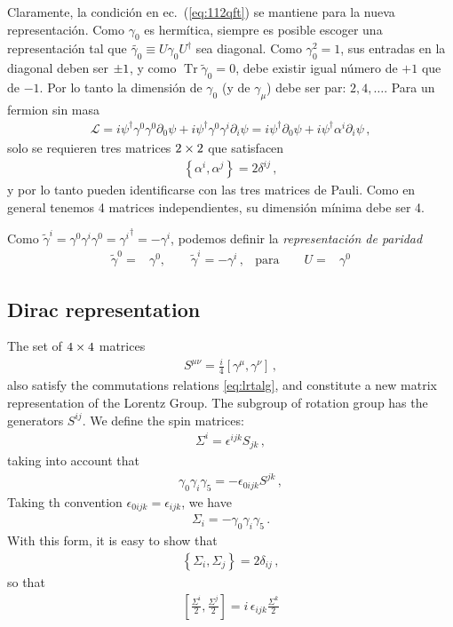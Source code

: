 Claramente, la condición en ec.~(\ref{eq:112qft}) se mantiene para la nueva representación. Como $\gamma_0$ es hermítica, siempre es posible escoger una representación tal que $\tilde{\gamma_0}\equiv U\gamma_0U^\dagger$ sea diagonal. Como $\gamma_0^2=1$, sus entradas en la diagonal deben ser $\pm1$, y como $\operatorname{Tr}\tilde\gamma_0=0$, debe existir igual número de $+1$ que de $-1$. Por lo tanto la dimensión de $\gamma_0$ (y de $\gamma_\mu$) debe ser par: $2,4,\ldots$. Para un fermion sin masa
\begin{align}
  \mathcal{L}=i\psi^\dagger\gamma^0\gamma^0\partial_0\psi+i\psi^\dagger\gamma^0\gamma^i\partial_i\psi=i\psi^\dagger\partial_0\psi+i\psi^\dagger\alpha^i\partial_i\psi\,,
\end{align}
solo se requieren tres matrices $2\times 2$ que satisfacen
\begin{align}
  \left\{\alpha^i,\alpha^j\right\} =2\delta^{ij}\,,
\end{align}
y por lo tanto pueden identificarse con las tres matrices de Pauli. 
Como en general tenemos 4 matrices independientes, su dimensión mínima debe ser 4.

Como $\tilde\gamma^i=\gamma^0\gamma^i\gamma^0={\gamma^i}^\dagger=-\gamma^i$, podemos definir la \emph{representación de paridad}
\begin{align}
\label{eq:parityrep}
\tilde\gamma^0=&\gamma^0,\qquad\tilde\gamma^i=-\gamma^i\,,&\text{para}\qquad U=&\gamma^0   
\end{align}




\begin{inprogress}
  \subsection{Dirac representation}
The set of $4\times 4$ matrices
\begin{align}
  S^{\mu\nu}=\frac{i}{4}\left[\gamma^\mu,\gamma^\nu\right]\,,
\end{align}
also satisfy the commutations relations \eqref{eq:lrtalg}, and constitute a new matrix representation of the Lorentz Group. The subgroup of rotation group has the generators $S^{ij}$. We define the spin matrices:
\begin{align}
  \Sigma^i=\epsilon^{ijk}S_{jk}\,,
\end{align}
taking into account that
\begin{align}
  \gamma_0\gamma_i\gamma_5=-\epsilon_{0ijk}S^{jk}\,,
\end{align}
Taking th convention $\epsilon_{0ijk}=\epsilon_{ijk}$, we have
\begin{align}
  \Sigma_{i}=-\gamma_0\gamma_i\gamma_5\,.
\end{align}
With this form, it is easy to show that
\begin{align}
  \left\{\Sigma_i,\Sigma_j\right\}=2\delta_{ij}\,, 
\end{align}
so that 
\begin{align}
  \left[\frac{\Sigma^i}{2},\frac{\Sigma^j}{2} \right]=i\,\epsilon_{ijk}\frac{\Sigma^k}{2}
\end{align}
\end{inprogress}

